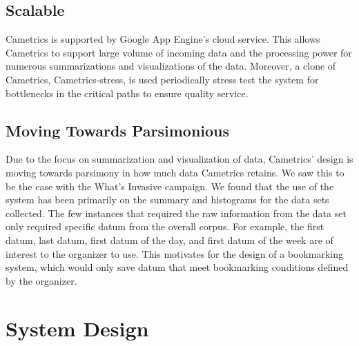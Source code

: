 \documentclass[10pt,a4paper,english]{article}
\begin{document}

\hypertarget{scalable}{}
\subsection*{Scalable}
\label{scalable}

Cametrics is supported by Google App Engine's cloud service. This allows Cametrics to support large volume of incoming data and the processing power for numerous summarizations and visualizations of the data. Moreover, a clone of Cametrics, Cametrics-stress, is used periodically stress test the system for bottlenecks in the critical paths to ensure quality service.



\hypertarget{moving-towards-parsimonious}{}
\subsection*{Moving Towards Parsimonious}
\label{moving-towards-parsimonious}

Due to the focus on summarization and visualization of data, Cametrics' design is moving towards parsimony in how much data Cametrics retains. We saw this to be the case with the What's Invasive campaign. We found that the use of the system has been primarily on the summary and histograms for the data sets collected. The few instances that required the raw information from the data set only required specific datum from the overall corpus. For example, the first datum, last datum, first datum of the day, and first datum of the week are of interest to the organizer to use. This motivates for the design of a bookmarking system, which would only save datum that meet bookmarking conditions defined by the organizer.


\pagebreak{}




\hypertarget{system-design}{}
\section*{System Design}
\label{system-design}
\end{document}
